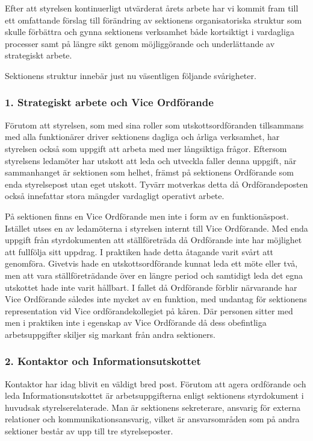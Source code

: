\documentclass[../_main/handlingar.tex]{subfiles}
\begin{document}

Efter att styrelsen kontinuerligt utvärderat årets arbete har vi kommit fram till ett omfattande förslag till förändring av sektionens organisatoriska struktur som skulle förbättra och gynna sektionens verksamhet både kortsiktigt i vardagliga processer samt på längre sikt genom möjliggörande och underlättande av strategiskt arbete. 

Sektionens struktur innebär just nu väsentligen följande svårigheter.

\subsubsection{1. Strategiskt arbete och Vice Ordförande} 

Förutom att styrelsen, som med sina roller som utskottsordföranden tillsammans med alla funktionärer driver sektionens dagliga och årliga verksamhet, har styrelsen också som uppgift att arbeta med mer långsiktiga frågor. Eftersom styrelsens ledamöter har utskott att leda och utveckla faller denna uppgift, när sammanhanget är sektionen som helhet, främst på sektionens Ordförande som enda styrelsepost utan eget utskott. Tyvärr motverkas detta då Ordförandeposten också innefattar stora mängder vardagligt operativt arbete. 

På sektionen finns en Vice Ordförande men inte i form av en funktionäspost. Istället utses en av ledamöterna i styrelsen internt till Vice Ordförande. Med enda uppgift från styrdokumenten att ställföreträda då Ordförande inte har möjlighet att fullfölja sitt uppdrag. I praktiken hade detta åtagande varit svårt att genomföra. Givetvis hade en utskottsordförande kunnat leda ett möte eller två, men att vara ställföreträdande över en längre period och samtidigt leda det egna utskottet hade inte varit hållbart. I fallet då Ordförande förblir närvarande har Vice Ordförande således inte mycket av en funktion, med undantag för sektionens representation vid Vice ordförandekollegiet på kåren. Där personen sitter med men i praktiken inte i egenskap av Vice Ordförande då dess obefintliga arbetsuppgifter skiljer sig markant från andra sektioners.

\subsubsection{2. Kontaktor och Informationsutskottet} 

Kontaktor har idag blivit en väldigt bred post. Förutom att agera ordförande och leda Informationsutskottet är arbetsuppgifterna enligt sektionens styrdokument i huvudsak styrelserelaterade. Man är sektionens sekreterare, ansvarig för externa relationer och kommunikationsansvarig, vilket är ansvarsområden som på andra sektioner består av upp till tre styrelseposter. 
\end{document}

